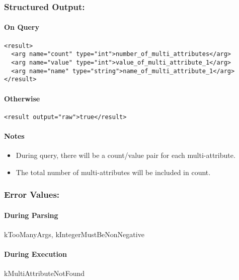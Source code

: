 \subsubsection*{Structured Output:}
\paragraph*{On Query}
\begin{verbatim}
<result>
  <arg name="count" type="int">number_of_multi_attributes</arg>
  <arg name="value" type="int">value_of_multi_attribute_1</arg>
  <arg name="name" type="string">name_of_multi_attribute_1</arg>
</result>
\end{verbatim}
\paragraph*{Otherwise}
\begin{verbatim}
<result output="raw">true</result>
\end{verbatim}
\paragraph*{Notes}
\begin{itemize}
\item  During query, there will be a count/value pair for each multi-attribute. 
\item  The total number of multi-attributes will be included in count. 
\end{itemize}
\subsubsection*{Error Values:}
\paragraph*{During Parsing}
 kTooManyArgs, kIntegerMustBeNonNegative
\paragraph*{During Execution}
 kMultiAttributeNotFound
